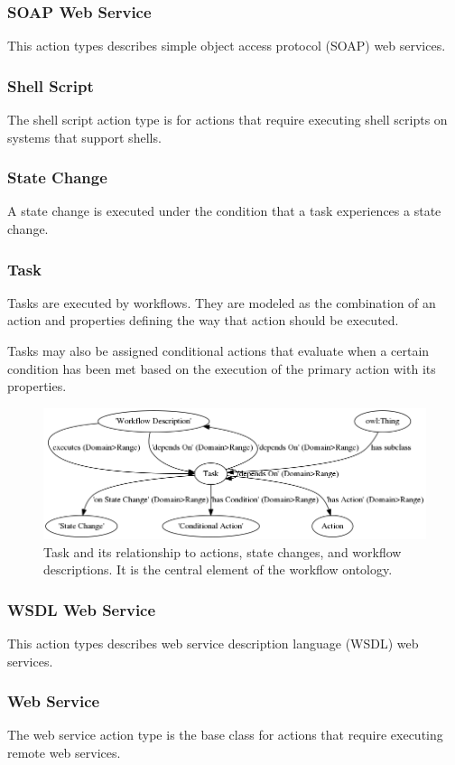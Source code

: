 \subsubsection{ SOAP Web Service } This action types describes simple object
access protocol (SOAP) web services.
\subsubsection{ Shell Script } The shell script action type is for actions that
require executing shell scripts on systems that support shells.
\subsubsection{ State Change } A state change is executed under the condition
that a task experiences a state change.
\subsubsection{Task}

Tasks are executed by workflows. They are modeled as the combination of an
action and properties defining the way that action should be executed.

Tasks may also be assigned conditional actions that evaluate when a certain
condition has been met based on the execution of the primary action with its
properties.

\begin{figure}[htbp] \centering
\includegraphics[width=\textwidth]{figures/task.png}
\caption{Task and its relationship to actions, state changes, and workflow
descriptions. It is the central element of the workflow ontology.}
\label{task}
\end{figure}


\subsubsection{ WSDL Web Service } This action types describes web service
description language (WSDL) web services.
\subsubsection{ Web Service } The web service action type is the base class for
actions that require executing remote web services.
